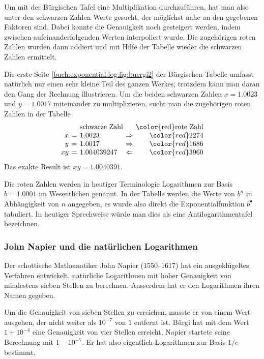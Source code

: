 Um mit der Bürgischen Tafel eine Multiplikation durchzuführen,
hat man also unter den schwarzen Zahlen Werte gesucht,
der möglichst nahe an den gegebenen Faktoren sind.
Dabei konnte die Genauigkeit noch gesteigert werden, indem zwischen
aufeinanderfolgenden Werten interpoliert wurde.
Die zugehörigen roten Zahlen wurden dann addiert und mit Hilfe der
Tabelle wieder die schwarzen Zahlen ermittelt.

\begin{beispiel}
Die erste Seite \ref{buch:exponential:log:fig:buergi2} der Bürgischen
Tabelle umfasst natürlich nur einen sehr kleine Teil des ganzen Werkes,
trotzdem kann man daran den Gang der Rechnung illustrieren.
Um die beiden schwarzen Zahlen $x=1.0023$ und $y=1.0017$ miteinander
zu multiplizieren, sucht man die zugehörigen roten Zahlen in
der Tabelle
\[
\renewcommand{\arraycolsep}{2pt}
\begin{array}{rclcr}
            & &\text{schwarze Zahl}&&\text{{\color{red}rote Zahl}} \\
           x&=&1.0023      &\Rightarrow&{\color{red}2274}\\
           y&=&1.0017      &\Rightarrow&{\color{red}1686}\\
          xy&=&1.004039247 &\Leftarrow &{\color{red}3960}
\end{array}
\]
Das exakte Result ist $xy=1.0040391$.
\end{beispiel}

Die roten Zahlen werden in heutiger Terminologie Logarithmen zur
Basis $b=1.0001$ im Wesentlichen genannt.
In der Tabelle werden die Werte von $b^n$ in Abhängigkeit von $n$
angegeben, es wurde also direkt die Exponentialfunktion $b^\bullet$
tabuliert.
In heutiger Sprechweise würde man dies als eine Antilogarithmentafel
bezeichnen.

\subsubsection{John Napier und die natürlichen Logarithmen}
Der schottische Mathematiker John Napier (1550--1617) hat ein
ausgeklügeltes Verfahren entwickelt, 
natürliche Logarithmen mit hoher Genauigkeit von mindestens sieben
Stellen zu berechnen.
Ausserdem hat er den Logarithmen ihren Namen gegeben.

Um die Genauigkeit von sieben Stellen zu erreichen, musste er von
einem Wert ausgehen, der nicht weiter als $10^{-7}$ von $1$ entfernt
ist.
Bürgi hat mit dem Wert $1+10^{-4}$ eine Genauigkeit von vier Stellen
erreicht, Napier startete seine Berechnung mit $1-10^{-7}$.
Er hat also eigentlich Logarithmen zur Basis $1/e$ bestimmt.

